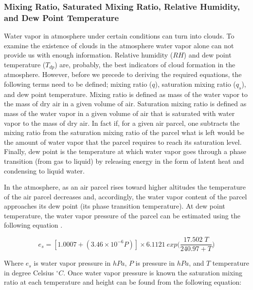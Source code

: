 \documentclass[a4paper,12pt]{article}
\numberwithin{equation}{section} %
\begin{document}
\subsubsection{Mixing Ratio, Saturated Mixing Ratio, Relative Humidity, and Dew Point Temperature}

Water vapor in atmosphere under certain conditions can turn into clouds. To examine the existence of clouds in the atmosphere water vapor alone can not provide us with enough information. Relative humidity ($RH$) and dew point temperature ($T_{dp}$) are, probably, the best indicators of cloud formation in the atmosphere. However, before we precede to deriving the required equations, the following terms need to be defined; mixing ratio ($q$), saturation mixing ratio ($q_s$), and dew point temperature. Mixing ratio is defined as mass of the water vapor to the mass of dry air in a given volume of air. Saturation mixing ratio is defined as mass of the water vapor in a given volume of air that is saturated with water vapor to the mass of dry air. In fact if, for a given air parcel, one subtracts the mixing ratio from the saturation mixing ratio of the parcel what is left would be the amount of water vapor that the parcel requires to reach its saturation level. Finally, dew point is the temperature at which water vapor goes through a phase transition (from gas to liquid) by releasing energy in the form of latent heat and condensing to liquid water.

In the atmosphere, as an air parcel rises toward higher altitudes the temperature of the air parcel decreases and, accordingly, the water vapor content of the parcel approaches its dew point (its phase transition temperature). %
At dew point temperature, the water vapor pressure of the parcel can be estimated using the following equation \citep{arden}. 

\vspace{0.25cm}
\begin{equation}\label{eq:3}
e_s = [1.0007 + (3.46 \times 10^{-6} P)] \times 6.1121 \: exp\Big(\frac{17.502\; T}{240.97 + T}\Big)
\end{equation}
\vspace{0.25cm}

Where $e_s$ is water vapor pressure in $hPa$, $P$ is pressure in $hPa$, and $T$ temperature in degree Celsius $^\circ C$.
Once water vapor pressure is known the saturation mixing ratio at each temperature and height can be found from the following equation:
\end{document}
